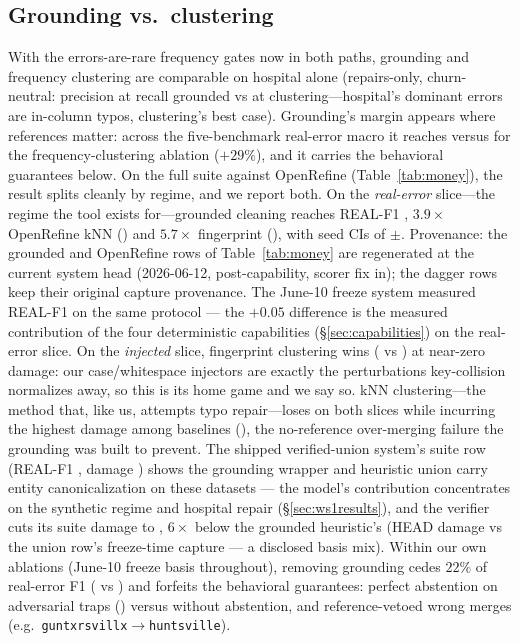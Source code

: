 \documentclass[11pt]{article}
\begin{document}
\subsection{Grounding vs.\ clustering}
With the errors-are-rare frequency gates now in both paths, grounding and frequency
clustering are comparable on hospital alone (repairs-only, churn-neutral:
\hospPrecGrounded{} precision at \hospRecallGrounded{} recall grounded vs
\hospPrecFreq{} at \hospRecallFreq{} clustering---hospital's dominant errors are
in-column typos, clustering's best case). Grounding's margin appears where references
matter: across the five-benchmark real-error macro it reaches \ablFullRealF{} versus
\ablNoGroundRealF{} for the frequency-clustering ablation ($+29\%$), and it carries
the behavioral guarantees below.
On the full suite against OpenRefine (Table~\ref{tab:money}), the result splits
cleanly by regime, and we report both. On the \emph{real-error} slice---the regime the
tool exists for---grounded cleaning reaches REAL-F1 \realFGrounded{}, $3.9\times$
OpenRefine kNN (\realFORKnn) and $5.7\times$ fingerprint (\realFORFp), with seed CIs of
$\pm$\northGroundedCI. Provenance: the grounded and OpenRefine rows of
Table~\ref{tab:money} are regenerated at the current system head (2026-06-12,
post-capability, scorer fix in); the dagger rows keep their original capture
provenance. The June-10 freeze system measured REAL-F1 \realFGroundedFreeze{} on the
same protocol --- the $+0.05$ difference is the measured contribution of the four
deterministic capabilities (\S\ref{sec:capabilities}) on the real-error slice. On the \emph{injected} slice, fingerprint clustering wins
(\injFORFp{} vs \injFGrounded) at near-zero damage: our case/whitespace injectors are
exactly the perturbations key-collision normalizes away, so this is its home game and
we say so. kNN clustering---the method that, like us, attempts typo repair---loses on
both slices while incurring the highest damage among baselines (\damageORKnn), the
no-reference over-merging failure the grounding was built to prevent. The shipped
verified-union system's suite row (REAL-F1 \modelRealF, damage \modelDamage) shows the
grounding wrapper and heuristic union carry entity canonicalization on these datasets ---
the model's contribution concentrates on the synthetic regime and hospital repair
(\S\ref{sec:ws1results}), and the verifier cuts its suite damage to \modelDamage,
$6\times$ below the grounded heuristic's \damageGrounded{} (HEAD damage vs the union
row's freeze-time capture --- a disclosed basis mix). Within our own ablations
(June-10 freeze basis throughout), removing grounding cedes $22\%$ of real-error
F1 (\ablNoGroundRealF{} vs \ablFullRealF) and forfeits the behavioral guarantees:
perfect abstention on adversarial traps (\ablFullAbstain) versus
\ablNoAbstainAbstain{} without abstention, and reference-vetoed wrong merges (e.g.\
\texttt{guntxrsvillx}$\to$\texttt{huntsville}).
\end{document}
